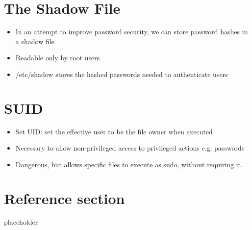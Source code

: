 \documentclass{article}
\begin{document}
\section{The Shadow File}
\begin{itemize}
  \item In an attempt to improve password security, we can store password hashes in a shadow file 
  \item Readable only by root users 
  \item /etc/shadow stores the hashed passwords needed to authenticate users
\end{itemize}

\section{SUID}
\begin{itemize}
  \item Set UID: set the effective user to be the file owner when executed 
  \item Necessary to allow non-privileged access to privileged actions e.g. passwords 
  \item Dangerous, but allows specific files to execute as sudo, without requiring it.
\end{itemize}



\pagebreak
\section*{Reference section} \label{sec:reference}
\begin{description}
	\item[placeholder] \hfill \\
\end{description}
\end{document}
